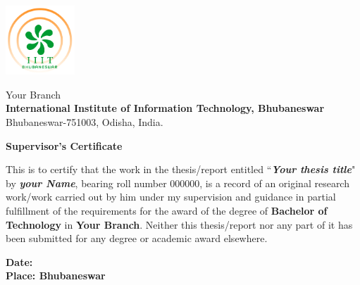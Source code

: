 \thispagestyle{empty} 
\begin{minipage}{.1\linewidth}
\hspace*{-.6cm}\includegraphics[height=2.6cm]{front/IIIT_Bhubaneswar_Logo}
\end{minipage}
\hspace{.4cm}
\begin{minipage}{1\linewidth}
{\normalsize
\textsf{Your Branch\\
\textbf{International Institute of Information Technology, Bhubaneswar\\}}}
{\normalsize
\textsf{
Bhubaneswar-751003, Odisha, India.}}
\end{minipage}
\vspace{.3in}

\fontsize{12}{14}
\selectfont
\begin{flushright}
\end{flushright}
\vspace{.2in}
\centerline{\Large{\bf Supervisor's Certificate}}
\vspace{1cm}
\noindent
This is to certify that the work in the thesis/report entitled ``{\bf \em Your thesis title}" by {\bf \em your Name}, bearing roll number 000000, is a record of an original research work/work carried out by him under my supervision and guidance in partial fulfillment of the requirements for the award of the degree of {\bf Bachelor of Technology} in {\bf Your Branch}. Neither this thesis/report nor any part of it has been submitted for any degree or academic award elsewhere.\\

\vspace*{0.3in}

\begin{flushleft}
	\fontsize{10}{10}
	\selectfont
		\textbf{Date: }\\
		\textbf{Place: Bhubaneswar}\\
\end{flushleft}

